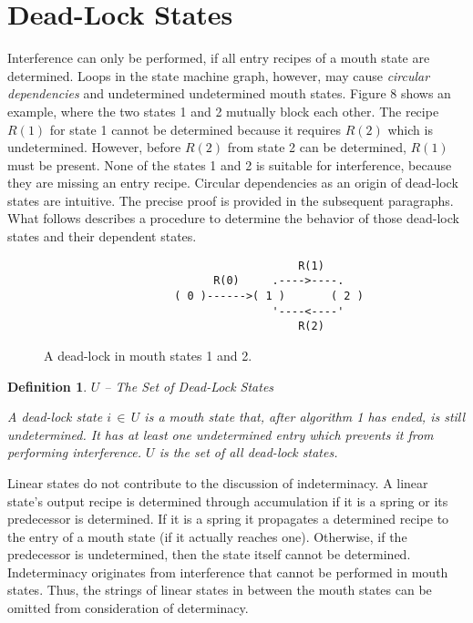 \documentclass[12pt,a4paper]{scrartcl}
\newtheorem{definition}{Definition}
\begin{document}
\section{Dead-Lock States}

Interference can only be performed, if all entry recipes of a mouth state are
determined. Loops in the state machine graph, however, may cause
\textit{circular dependencies} and undetermined undetermined mouth states.
Figure 8 shows an example, where the two states 1 and 2 mutually block each
other. The recipe $R(1)$ for state 1 cannot be determined because it requires
$R(2)$ which is undetermined. However, before $R(2)$ from state 2 can be
determined, $R(1)$ must be present. None of the states 1 and 2 is suitable for
interference, because they are missing an entry recipe.  Circular dependencies
as an origin of dead-lock states are intuitive. The precise proof is provided
in the subsequent paragraphs. What follows describes a procedure to determine
the behavior of those dead-lock states and their dependent states.

\begin{figure}[htbp] \leavevmode
\begin{verbatim}
                                       R(1)
                          R(0)     .---->----.
                    ( 0 )------>( 1 )       ( 2 )
                                   '----<----'
                                       R(2)

\end{verbatim}
\caption{A dead-lock in mouth states 1 and 2.}
\end{figure}

\begin{definition} $U$ -- The Set of Dead-Lock States

A dead-lock state $i\,\in\,U$ is a mouth state that, after algorithm 1 has
ended, is still undetermined. It has at least one undetermined entry which
prevents it from performing interference. $U$ is the set of all dead-lock
states.

\end{definition}

Linear states do not contribute to the discussion of indeterminacy. A linear
state's output recipe is determined through accumulation if it is a spring or
its predecessor is determined. If it is a spring it propagates a determined
recipe to the entry of a mouth state (if it actually reaches one). Otherwise,
if the predecessor is undetermined, then the state itself cannot be determined.
Indeterminacy originates from interference that cannot be performed in mouth
states. Thus, the strings of linear states in between the mouth states can be
omitted from consideration of determinacy.
\end{document}
